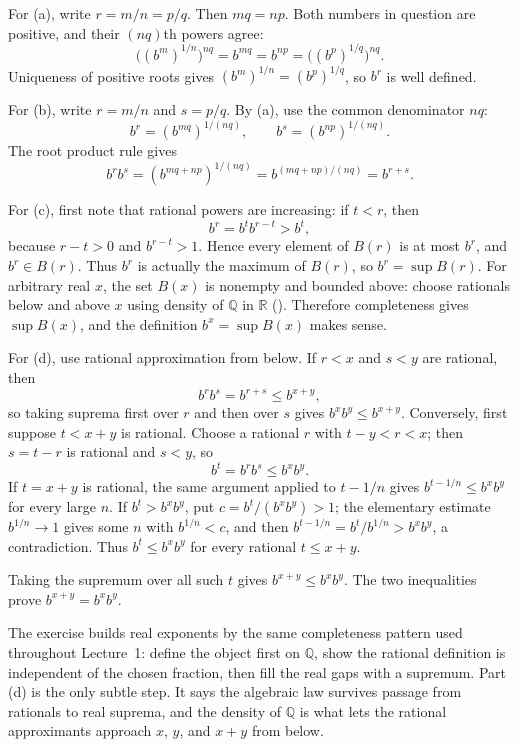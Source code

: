 \documentclass[main.tex]{subfiles}
\begin{document}
\begin{SolutionBlue}
For (a), write $r=m/n=p/q$. Then $mq=np$. Both numbers in question are positive, and their
$(nq)$th powers agree:
\[
\bigl((b^m)^{1/n}\bigr)^{nq}=b^{mq}=b^{np}=\bigl((b^p)^{1/q}\bigr)^{nq}.
\]
Uniqueness of positive roots gives $(b^m)^{1/n}=(b^p)^{1/q}$, so $b^r$ is well defined.

For (b), write $r=m/n$ and $s=p/q$. By (a), use the common denominator $nq$:
\[
b^r=(b^{mq})^{1/(nq)},\qquad b^s=(b^{np})^{1/(nq)}.
\]
The root product rule gives
\[
b^r b^s=(b^{mq+np})^{1/(nq)}=b^{(mq+np)/(nq)}=b^{r+s}.
\]

For (c), first note that rational powers are increasing: if $t<r$, then
\[
b^r=b^t b^{r-t}>b^t,
\]
because $r-t>0$ and $b^{r-t}>1$. Hence every element of $B(r)$ is at most $b^r$, and $b^r\in B(r)$.
Thus $b^r$ is actually the maximum of $B(r)$, so $b^r=\sup B(r)$. For arbitrary real $x$, the set
$B(x)$ is nonempty and bounded above: choose rationals below and above $x$ using density of
$\mathbb Q$ in $\mathbb R$ (). Therefore completeness gives $\sup B(x)$, and the
definition $b^x=\sup B(x)$ makes sense.

For (d), use rational approximation from below. If $r<x$ and $s<y$ are rational, then
\[
b^r b^s=b^{r+s}\le b^{x+y},
\]
so taking suprema first over $r$ and then over $s$ gives $b^x b^y\le b^{x+y}$.
Conversely, first suppose $t<x+y$ is rational. Choose a rational $r$ with $t-y<r<x$; then
$s=t-r$ is rational and $s<y$, so
\[
b^t=b^r b^s\le b^x b^y.
\]
If $t=x+y$ is rational, the same argument applied to $t-1/n$ gives $b^{t-1/n}\le b^x b^y$ for every
large $n$. If $b^t>b^x b^y$, put $c=b^t/(b^x b^y)>1$; the elementary estimate $b^{1/n}\to 1$ gives
some $n$ with $b^{1/n}<c$, and then $b^{t-1/n}=b^t/b^{1/n}>b^x b^y$, a contradiction. Thus
$b^t\le b^x b^y$ for every rational $t\le x+y$.

Taking the supremum over all such $t$ gives $b^{x+y}\le b^x b^y$. The two inequalities prove
$b^{x+y}=b^x b^y$.
\end{SolutionBlue}

\begin{Reflection}
The exercise builds real exponents by the same completeness pattern used throughout Lecture~1:
define the object first on $\mathbb Q$, show the rational definition is independent of the chosen
fraction, then fill the real gaps with a supremum. Part (d) is the only subtle step. It says the
algebraic law survives passage from rationals to real suprema, and the density of $\mathbb Q$ is what
lets the rational approximants approach $x$, $y$, and $x+y$ from below.
\end{Reflection}
\end{document}
